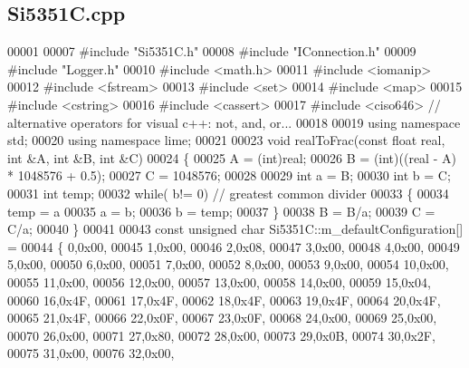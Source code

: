 \subsection{Si5351\+C.\+cpp}
\label{Si5351C_8cpp_source}

\begin{DoxyCode}
00001 
00007 \textcolor{preprocessor}{#include "Si5351C.h"}
00008 \textcolor{preprocessor}{#include "IConnection.h"}
00009 \textcolor{preprocessor}{#include "Logger.h"}
00010 \textcolor{preprocessor}{#include <math.h>}
00011 \textcolor{preprocessor}{#include <iomanip>}
00012 \textcolor{preprocessor}{#include <fstream>}
00013 \textcolor{preprocessor}{#include <set>}
00014 \textcolor{preprocessor}{#include <map>}
00015 \textcolor{preprocessor}{#include <cstring>}
00016 \textcolor{preprocessor}{#include <cassert>}
00017 \textcolor{preprocessor}{#include <ciso646>} \textcolor{comment}{// alternative operators for visual c++: not, and, or...}
00018 
00019 \textcolor{keyword}{using namespace }std;
00020 \textcolor{keyword}{using namespace }lime;
00021 
00023 \textcolor{keywordtype}{void} realToFrac(\textcolor{keyword}{const} \textcolor{keywordtype}{float} real, \textcolor{keywordtype}{int} &A, \textcolor{keywordtype}{int} &B, \textcolor{keywordtype}{int} &C)
00024 \{
00025     A = (int)real;
00026     B = (int)((real - A) * 1048576 + 0.5);
00027     C = 1048576;
00028 
00029     \textcolor{keywordtype}{int} a = B;
00030     \textcolor{keywordtype}{int} b = C;
00031     \textcolor{keywordtype}{int} temp;
00032     \textcolor{keywordflow}{while}( b!= 0) \textcolor{comment}{// greatest common divider}
00033     \{
00034         temp = a %
00035         a = b;
00036         b = temp;
00037     \}
00038     B = B/a;
00039     C = C/a;
00040 \}
00041 
00043 \textcolor{keyword}{const} \textcolor{keywordtype}{unsigned} \textcolor{keywordtype}{char} Si5351C::m\_defaultConfiguration[] =
00044 \{ 0,0x00,
00045   1,0x00,
00046   2,0x08,
00047   3,0x00,
00048   4,0x00,
00049   5,0x00,
00050   6,0x00,
00051   7,0x00,
00052   8,0x00,
00053   9,0x00,
00054  10,0x00,
00055  11,0x00,
00056  12,0x00,
00057  13,0x00,
00058  14,0x00,
00059  15,0x04,
00060  16,0x4F,
00061  17,0x4F,
00062  18,0x4F,
00063  19,0x4F,
00064  20,0x4F,
00065  21,0x4F,
00066  22,0x0F,
00067  23,0x0F,
00068  24,0x00,
00069  25,0x00,
00070  26,0x00,
00071  27,0x80,
00072  28,0x00,
00073  29,0x0B,
00074  30,0x2F,
00075  31,0x00,
00076  32,0x00,

\end{DoxyCode}
